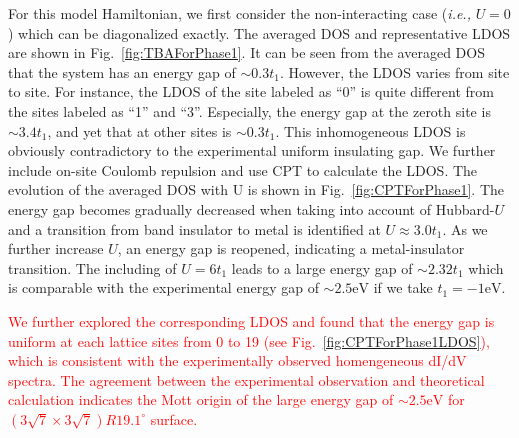 \documentclass[aps,prb,amsfonts,amsmath,amssymb,showpacs,groupedaddress,superscriptaddress]{revtex4-1}
\begin{document}
For this model Hamiltonian, we first consider the non-interacting case (\textit{i.e.,} $U = 0$) which can be diagonalized exactly. The averaged DOS and representative LDOS are shown in Fig.~\ref{fig:TBAForPhase1}. It can be seen from the averaged DOS that the system has an energy gap of $\sim 0.3 t_{1}$. However, the LDOS varies from site to site. For instance, the LDOS of the site labeled as ``0'' is quite different from the sites labeled as ``1'' and ``3''. Especially, the energy gap at the zeroth site is $\sim 3.4 t_{1}$, and yet that at other sites is $\sim 0.3 t_{1}$. This inhomogeneous LDOS is obviously contradictory to the experimental uniform insulating gap. We further include on-site Coulomb repulsion and use CPT to calculate the LDOS. The evolution of the averaged DOS with U is shown in Fig.~\ref{fig:CPTForPhase1}. The energy gap becomes gradually decreased when taking into account of Hubbard-$U$ and a transition from band insulator to metal is identified at $U \approx 3.0 t_{1}$. As we further increase $U$, an energy gap is reopened, indicating a metal-insulator transition. The including of $U = 6 t_{1}$ leads to a large energy gap of $\sim 2.32 t_{1}$ which is comparable with the experimental energy gap of $\sim 2.5 \text{eV}$ if we take $t_{1} = -1\text{eV}$.

\textcolor{red}{We further explored the corresponding LDOS and found that the energy gap is uniform at each lattice sites from 0 to 19 (see Fig.~\ref{fig:CPTForPhase1LDOS}), which is consistent with the experimentally observed homengeneous dI/dV spectra. The agreement between the experimental observation and theoretical calculation indicates the Mott origin of the large energy gap of $\sim 2.5\text{eV}$ for $(3\sqrt{7} \times 3\sqrt{7})R19.1^\circ$ surface.}
\end{document}
